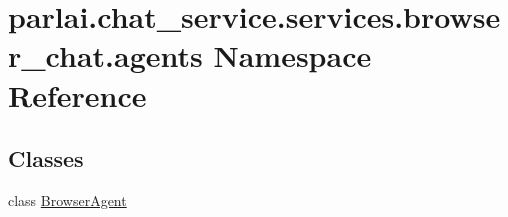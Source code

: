 \hypertarget{namespaceparlai_1_1chat__service_1_1services_1_1browser__chat_1_1agents}{}\section{parlai.\+chat\+\_\+service.\+services.\+browser\+\_\+chat.\+agents Namespace Reference}
\label{namespaceparlai_1_1chat__service_1_1services_1_1browser__chat_1_1agents}
\subsection*{Classes}
\begin{DoxyCompactItemize}
\item 
class \hyperlink{classparlai_1_1chat__service_1_1services_1_1browser__chat_1_1agents_1_1BrowserAgent}{Browser\+Agent}
\end{DoxyCompactItemize}
